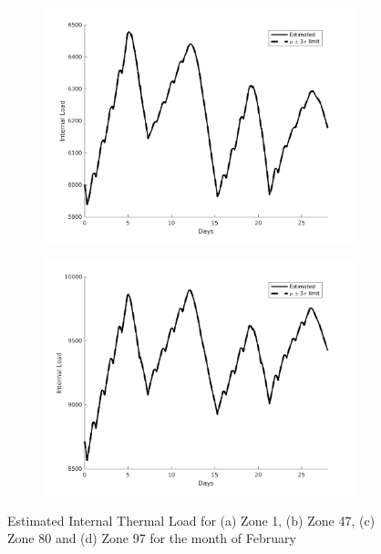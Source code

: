 \begin{figure}[H]
\begin{subfigure}{0.45\textwidth}
\includegraphics[width=\textwidth]{jbs_figures/load_3_2}
\caption{}
\label{load_3_2}
\end{subfigure}
\centering
\begin{subfigure}{0.45\textwidth}
\includegraphics[width=\textwidth]{jbs_figures/load_4_2}
\caption{}
\label{load_4_2}
\end{subfigure}
\caption{Estimated Internal Thermal Load for (a) Zone 1, (b) Zone 47, (c) Zone 80 and (d) Zone 97 for the month of February}
\label{fig:Zone_Int_temperature_feb}
\end{figure}


